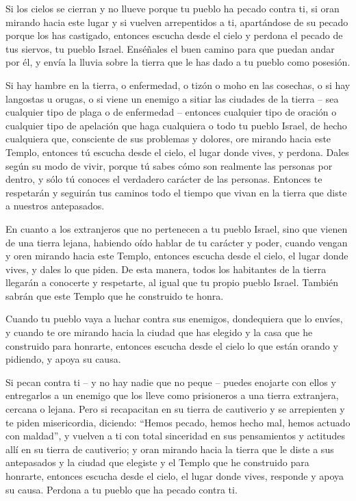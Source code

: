  Si los cielos se cierran y no llueve porque tu pueblo ha
pecado contra ti, si oran mirando hacia este lugar y si vuelven
arrepentidos a ti, apartándose de su pecado porque los has castigado,
 entonces escucha desde el cielo y perdona el pecado de tus
siervos, tu pueblo Israel. Enséñales el buen camino para que puedan
andar por él, y envía la lluvia sobre la tierra que le has dado a tu
pueblo como posesión.

 Si hay hambre en la tierra, o enfermedad, o tizón o moho
en las cosechas, o si hay langostas u orugas, o si viene un enemigo a
sitiar las ciudades de la tierra -- sea cualquier tipo de plaga o de
enfermedad --  entonces cualquier tipo de oración o
cualquier tipo de apelación que haga cualquiera o todo tu pueblo Israel,
de hecho cualquiera que, consciente de sus problemas y dolores, ore
mirando hacia este Templo,  entonces tú escucha desde el
cielo, el lugar donde vives, y perdona. Dales según su modo de vivir,
porque tú sabes cómo son realmente las personas por dentro, y sólo tú
conoces el verdadero carácter de las personas.  Entonces te
respetarán y seguirán tus caminos todo el tiempo que vivan en la tierra
que diste a nuestros antepasados.

 En cuanto a los extranjeros que no pertenecen a tu pueblo
Israel, sino que vienen de una tierra lejana, habiendo oído hablar de tu
carácter y poder, cuando vengan y oren mirando hacia este Templo,
 entonces escucha desde el cielo, el lugar donde vives, y
dales lo que piden. De esta manera, todos los habitantes de la tierra
llegarán a conocerte y respetarte, al igual que tu propio pueblo Israel.
También sabrán que este Templo que he construido te honra.

 Cuando tu pueblo vaya a luchar contra sus enemigos,
dondequiera que lo envíes, y cuando te ore mirando hacia la ciudad que
has elegido y la casa que he construido para honrarte, 
entonces escucha desde el cielo lo que están orando y pidiendo, y apoya
su causa.

 Si pecan contra ti -- y no hay nadie que no peque --
puedes enojarte con ellos y entregarlos a un enemigo que los lleve como
prisioneros a una tierra extranjera, cercana o lejana. 
Pero si recapacitan en su tierra de cautiverio y se arrepienten y te
piden misericordia, diciendo: ``Hemos pecado, hemos hecho mal, hemos
actuado con maldad'',  y vuelven a ti con total sinceridad
en sus pensamientos y actitudes allí en su tierra de cautiverio; y oran
mirando hacia la tierra que le diste a sus antepasados y la ciudad que
elegiste y el Templo que he construido para honrarte, 
entonces escucha desde el cielo, el lugar donde vives, responde y apoya
su causa. Perdona a tu pueblo que ha pecado contra ti.

